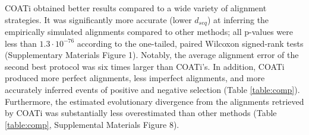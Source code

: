 \documentclass[12pt,letterpaper]{article}
\begin{document}


COATi obtained better results compared to a wide variety of alignment strategies. It was significantly more accurate (lower $d_{seq}$) at inferring the empirically simulated alignments compared to other methods; all p-values were less than $1.3 \cdot 10^{-76}$ according to the one-tailed, paired Wilcoxon signed-rank tests (Supplementary Materials Figure 1). Notably, the average alignment error of the second best protocol was six times larger than COATi's. In addition, COATi produced more perfect alignments, less imperfect alignments, and more accurately inferred events of positive and negative selection (Table \ref{table:comp}). Furthermore, the estimated evolutionary divergence from the alignments retrieved by COATi was substantially less overestimated than other methods (Table \ref{table:comp}, Supplemental Materials Figure 8).
\end{document}
